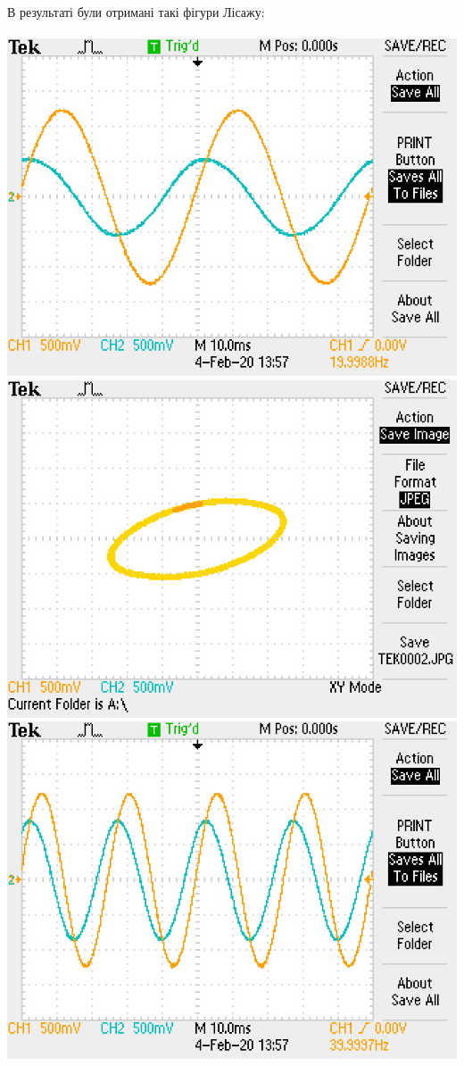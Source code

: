 В результаті були отримані такі фігури Лісажу:\\ 
\\
\includegraphics[width=\textwidth/2]{1-lab/res/3a.JPG}
\includegraphics[width=\textwidth/2]{1-lab/res/3b.JPG}\\
\includegraphics[width=\textwidth/2]{1-lab/res/4a.JPG}
